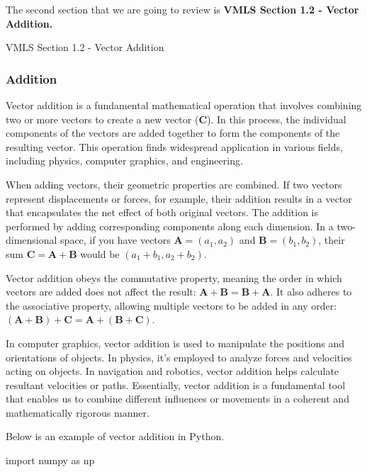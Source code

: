The second section that we are going to review is \textbf{VMLS Section 1.2 - Vector Addition.}

\begin{notes}{VMLS Section 1.2 - Vector Addition}
    \subsubsection*{Addition}

    Vector addition is a fundamental mathematical operation that involves combining two or more vectors to create a new vector ($\mathbf{C}$). In this process, the individual components of the vectors are 
    added together to form the components of the resulting vector. This operation finds widespread application in various fields, including physics, computer graphics, and engineering.

    When adding vectors, their geometric properties are combined. If two vectors represent displacements or forces, for example, their addition results in a vector that encapsulates the net effect of both 
    original vectors. The addition is performed by adding corresponding components along each dimension. In a two-dimensional space, if you have vectors $\mathbf{A} = (a_1, a_2)$ and $\mathbf{B} = (b_1, b_2)$, 
    their sum $\mathbf{C} = \mathbf{A} + \mathbf{B}$ would be $(a_1 + b_1, a_2 + b_2)$.  
    
    Vector addition obeys the commutative property, meaning the order in which vectors are added does not affect the result: $\mathbf{A} + \mathbf{B} = \mathbf{B} + \mathbf{A}$. It also adheres to the associative 
    property, allowing multiple vectors to be added in any order: $(\mathbf{A} + \mathbf{B}) + \mathbf{C} = \mathbf{A} + (\mathbf{B} + \mathbf{C})$.
    
    In computer graphics, vector addition is used to manipulate the positions and orientations of objects. In physics, it's employed to analyze forces and velocities acting on objects. In navigation and robotics, 
    vector addition helps calculate resultant velocities or paths. Essentially, vector addition is a fundamental tool that enables us to combine different influences or movements in a coherent and mathematically 
    rigorous manner.

    \begin{highlight}
        Below is an example of vector addition in Python.

    \begin{code}[Python]
    import numpy as np


\end{code}
\end{highlight}
\end{notes}
